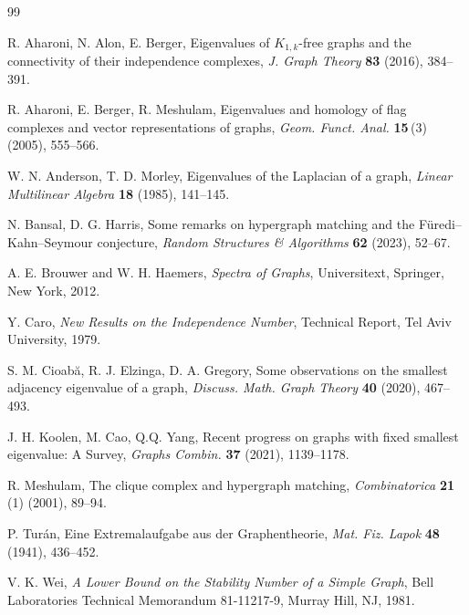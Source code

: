 \documentclass[11pt]{article}
\theoremstyle{plain}
\theoremstyle{definition}
\numberwithin{equation}{section}
\begin{document}
\begin{thebibliography}{99}

R. Aharoni, N. Alon, E. Berger,
Eigenvalues of $K_{1,k}$-free graphs and the connectivity of their independence complexes,
\emph{J. Graph Theory} \textbf{83} (2016), 384--391.

R. Aharoni, E. Berger, R. Meshulam,
Eigenvalues and homology of flag complexes and vector representations of graphs,
\emph{Geom. Funct. Anal.} \textbf{15}\,(3) (2005), 555--566.

W. N. Anderson, T. D. Morley,
Eigenvalues of the Laplacian of a graph,
\emph{Linear Multilinear Algebra} \textbf{18} (1985), 141--145.

 N. Bansal, D. G. Harris,
Some remarks on hypergraph matching and the F\"uredi--Kahn--Seymour conjecture,
\emph{Random Structures \& Algorithms} \textbf{62} (2023), 52--67.

A. E. Brouwer and W. H. Haemers, \emph{Spectra of Graphs},
Universitext, Springer, New York, 2012.

Y. Caro, \emph{New Results on the Independence Number},
Technical Report, Tel Aviv University, 1979.

S. M. Cioab\u{a}, R. J. Elzinga, D. A. Gregory,
Some observations on the smallest adjacency eigenvalue of a graph,
\emph{Discuss. Math. Graph Theory} \textbf{40} (2020), 467--493.

J. H. Koolen, M. Cao, Q.Q. Yang, Recent progress on graphs with fixed smallest
eigenvalue: A Survey, \emph{Graphs Combin.} \textbf{37} (2021), 1139--1178.

R. Meshulam,
The clique complex and hypergraph matching,
\emph{Combinatorica} \textbf{21}\,(1) (2001), 89--94.

P. Tur\'{a}n,
Eine Extremalaufgabe aus der Graphentheorie,
\emph{Mat. Fiz. Lapok} \textbf{48} (1941), 436--452.

V. K. Wei,
\emph{A Lower Bound on the Stability Number of a Simple Graph},
Bell Laboratories Technical Memorandum 81-11217-9, Murray Hill, NJ, 1981.

\end{thebibliography}
\end{document}
